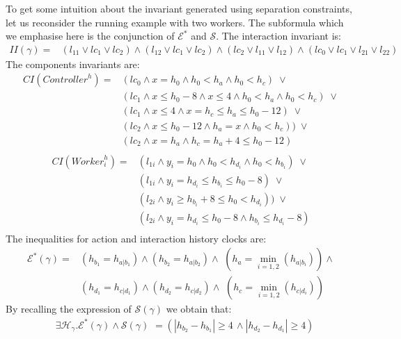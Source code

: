 \documentclass{LMCS}
\newcommand{\eqsc}{\mathcal{E}^*}
\newcommand{\ctn}{\mathit{Controller}}
\newcommand{\cwk}{\mathit{Worker}}
\newcommand{\ic}{\mathit{CI}}
\newcommand{\iim}{\mathit{II}}
\newcommand{\sep}{\mathcal{S}}
\newcommand{\te}{h_0}
\theoremstyle{plain}\newtheorem{remark}[thm]{Remark}
\theoremstyle{plain}\newtheorem{example}[thm]{Example}
\begin{document}
\begin{exa}
  To get some intuition about the invariant generated using separation
  constraints, let us reconsider the running example with two
  workers. The subformula which we emphasise here is the conjunction
  of $\mathcal{E}^{*}$ and $\mathtt{\mathcal{S}}$. The interaction invariant is:
 \begin{align*}
\iim(\gamma) = 
& (l_{11}\vee lc_{1}\vee lc_{2}) \wedge (l_{12}\vee lc_{1}\vee lc_{2})  \wedge 
 (lc_{2}\vee l_{11}\vee l_{12})\wedge(lc_{0}\vee lc_{1}\vee l_{21}\vee l_{22})
\end{align*}
The components invariants are:
\begin{align*}
\ic(\ctn^{h}) = 
& (lc_0 \wedge x = \te \wedge \te < h_a \wedge \te < h_c )\; {\vee}  \\
& (lc_1 \wedge x \leq \te - 8 \wedge  x \leq 4 \wedge \te < h_a  \wedge \te < h_c ) \; {\vee} \\
& (lc_1 \wedge x \leq 4 \wedge  x = h_c \leq h_a \leq \te - 12)\; {\vee} \\
& (lc_2 \wedge x \leq \te - 12 \wedge h_a=x \wedge \te < h_c ))\; {\vee} \\
& (lc_2 \wedge x=h_{a} \wedge  h_{c}=h_{a} + 4 \leq \te - 12)\\
\end{align*}
\begin{align*}
 \ic(\cwk_i^{h}) = 
& (l_{1i} \wedge y_i =\te  \wedge \te < h_{d_i} \wedge \te < h_{b_i}    ) \; {\vee}  \\
& (l_{1i} \wedge  y_i = h_{d_i}  \leq h_{b_i} \leq \te - 8) \; {\vee} \\
& (l_{2i} \wedge y_i \geq h_{b_i}+8 \leq \te < h_{d_i}  )) \; {\vee} \\
& (l_{2i} \wedge y_i =h_{d_i}  \leq \te - 8 \wedge h_{b_i} \leq h_{d_i} - 8 ) \\
\end{align*}
The inequalities for action and interaction history clocks are:
\begin{align*}
\eqsc(\gamma) =
& (h_{b_1}=h_{a|b_{1}}) \wedge (h_{b_2}=h_{a|b_{2}}) \wedge\,\, (h_{a}=\min_{i=1,2}(h_{a|b_{i}})) \wedge \\
& (h_{d_1}=h_{c|d_{1}}) \wedge (h_{d_2}=h_{c|d_{2}}) \wedge\,\, (h_{c}=\min_{i=1,2}(h_{c|d_{i}})) 
\end{align*}
By recalling the expression of $\sep(\gamma)$ we obtain that:
\begin{align*}
& \exists\mathcal{H}_{\gamma}.\mathcal{E}^{*}\left(\gamma\right)\wedge\mathcal{S}(\gamma)\,\, = (|h_{b_{2}}-h_{b_{1}}|\geq 4\,\wedge|h_{d_{2}}-h_{d_{1}}|\geq 4)

\end{align*}
\end{exa}
\end{document}
